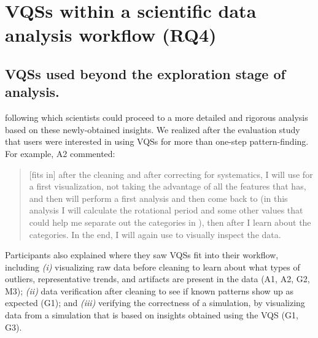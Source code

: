\section{VQSs within a scientific data analysis workflow (RQ4)}
\subsection{VQSs used beyond the exploration stage of analysis.} 
\par {}  following which scientists could proceed to a more detailed and rigorous analysis based on these newly-obtained insights. We realized after the evaluation study that users were interested in using VQSs for more than one-step pattern-finding. For example, A2 commented:
\begin{quote}
[\zv fits in] after the cleaning and after correcting for systematics, I will use \zv for a first visualization, not taking the advantage of all the features that \zv has, and then will perform a first analysis and then come back to \zv (in this analysis I will calculate the rotational period and some other values that could help me separate out the categories in \zv), then after I learn about the categories. In the end, I will again use \zv to visually inspect the data. %
\end{quote}
Participants also explained where they saw VQSs fit into their workflow, including {\em (i)}
visualizing raw data before cleaning to learn about what types of outliers, representative trends, and artifacts are present in the data (A1, A2, G2, M3); {\em (ii)}
 data verification after cleaning to see if known patterns show up as expected (G1);
 and {\em (iii)}
verifying the correctness of a simulation, by visualizing data from a simulation that is based on insights obtained using the VQS (G1, G3).
